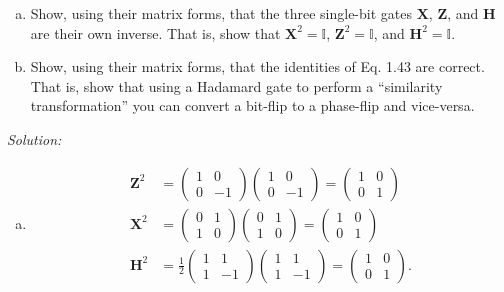 \documentclass{book}
\theoremstyle{definition}
\newcommand{\X}{\mathbf{X}}
\newcommand{\f}[2]{\frac{#1}{#2}}
\newcommand{\Id}{\mathbb{I}}
\newcommand{\had}{\mathbf{H}}
\begin{document}
\begin{enumerate}[(a)]
	\item Show, using their matrix forms, that the three single-bit gates $\X$, $\mathbf{Z}$, and $\had$ are their
	own inverse. That is, show that $\X^2 = \Id$, $\mathbf{Z}^2 = \Id$, and $\had^2 = \Id$.
	\item Show, using their matrix forms, that the identities of Eq. 1.43 are correct. That is, show
	that using a Hadamard gate to perform a ``similarity transformation'' you can convert a bit-flip to a phase-flip and vice-versa.
\end{enumerate}

\noindent \textit{Solution:} 

\begin{enumerate}[(a)]
	\item 
	\begin{align}
	\mathbf{Z}^2 &= \begin{pmatrix}
	1&0\\0&-1
	\end{pmatrix}\begin{pmatrix}
	1&0\\0&-1
	\end{pmatrix} = \begin{pmatrix}
	1&0\\0&1
	\end{pmatrix}\\
	\X^2 &= \begin{pmatrix}
	0&1\\1&0
	\end{pmatrix}\begin{pmatrix}
	0&1\\1&0
	\end{pmatrix} = \begin{pmatrix}
	1&0\\0&1
	\end{pmatrix}\\
	\had^2 &= \f{1}{2}\begin{pmatrix}
	1&1\\1&-1
	\end{pmatrix}\begin{pmatrix}
	1&1\\1&-1
	\end{pmatrix} = \begin{pmatrix}
	1&0\\0&1
	\end{pmatrix}.
	\end{align}
	

\end{enumerate}
\end{document}
